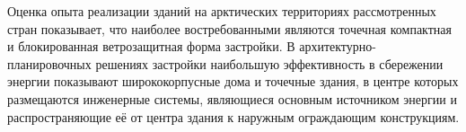 Оценка опыта реализации зданий на арктических территориях рассмотренных стран показывает, что наиболее востребованными являются точечная компактная и блокированная ветрозащитная форма
застройки. В архитектурно-планировочных решениях застройки наибольшую эффективность в сбережении энергии показывают ширококорпусные дома
и точечные здания, в центре которых размещаются инженерные системы, являющиеся основным источником энергии и распространяющие её от центра здания
к наружным ограждающим конструкциям.